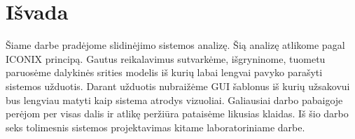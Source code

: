 \documentclass[oneside]{VUMIFPSkursinis}
\begin{document}
\section{Išvada}
Šiame darbe pradėjome slidinėjimo sistemos analizę. Šią analizę atlikome pagal ICONIX principą. Gautus reikalavimus sutvarkėme, išgryninome, tuometu paruosėme dalykinės srities modelis iš kurių labai lengvai pavyko parašyti sistemos užduotis. Darant užduotis nubraižėme GUI šablonus iš kurių užsakovui bus lengviau matyti kaip sistema atrodys vizuoliai. Galiausiai darbo pabaigoje perėjom per visas dalis ir atlikę peržiūra pataisėme likusias klaidas. Iš šio darbo seks tolimesnis sistemos projektavimas kitame laboratoriniame darbe.
\end{document}
